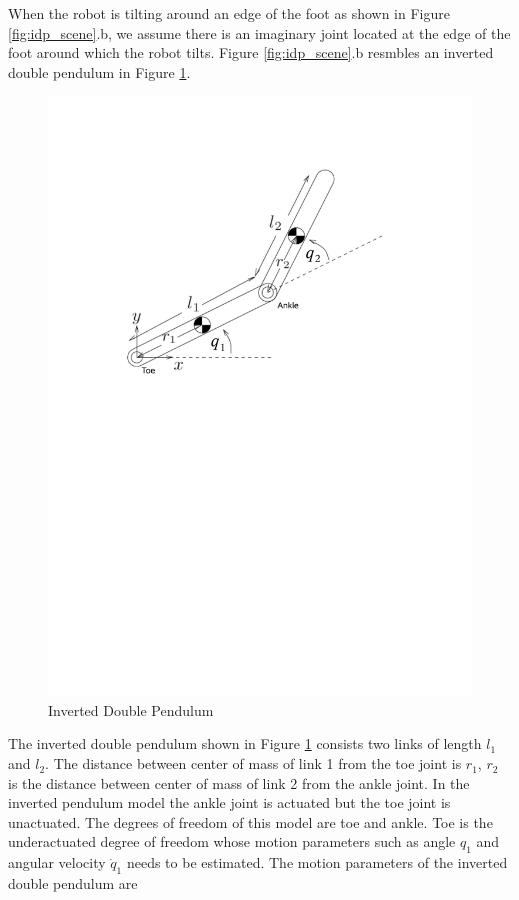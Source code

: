When the robot is tilting around an edge of the foot as shown in Figure \ref{fig:idp_scene}.b, we assume there is an imaginary joint located at the edge of the foot around which the robot tilts. Figure \ref{fig:idp_scene}.b resmbles an inverted double pendulum in Figure \ref{fig:idp}.
\begin{figure}[H]
	\centering
	\includegraphics[trim= 0mm 150mm 0mm 0mm, scale=0.65]{Bilder/inv_db_pend.pdf}
	\caption[Inverted Double Pendulum]{Inverted Double Pendulum \footnotemark}
	\label{fig:idp}
\end{figure}
 The inverted double pendulum shown in Figure \ref{fig:idp} consists two links of length $l_1$ and $l_2$. The distance between center of mass of link 1 from the toe joint is $r_1$, $r_2$ is the distance between center of mass of link 2 from the ankle joint. In the inverted pendulum model the ankle joint is actuated but the toe joint is unactuated. The degrees of freedom of this model are toe and ankle. Toe is the underactuated degree of freedom whose motion parameters such as angle $q_1$ and angular velocity $\dot{q}_1$ needs to be estimated. The motion parameters of the inverted double pendulum are 

